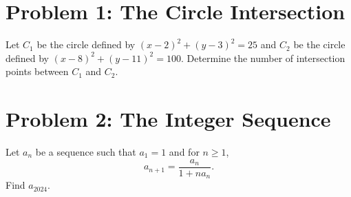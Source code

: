 \documentclass{article}
\begin{document}
\section*{Problem 1: The Circle Intersection}

Let $C_1$ be the circle defined by $(x-2)^2 + (y-3)^2 = 25$ and $C_2$ be the circle defined by $(x-8)^2 + (y-11)^2 = 100$. 
Determine the number of intersection points between $C_1$ and $C_2$.

\section*{Problem 2: The Integer Sequence}
Let $a_n$ be a sequence such that $a_1 = 1$ and for $n \ge 1$, 
\[ a_{n+1} = \frac{a_n}{1 + n a_n}. \]
Find $a_{2024}$.
\end{document}
